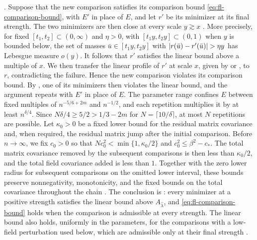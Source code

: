 \cite[Lemma~6.2]{oai-fluctuations}. Suppose that the new comparison satisfies its comparison bound \eqref{eq:fl-comparison-bound}, with $E'$ in place of $E$, and let $r'$ be its minimizer at its final strength. The two minimizers are then close at every scale $y\gtrsim x$ \cite[Lemmas~6.3--6.5]{oai-fluctuations}. More precisely, for fixed $[t_1,t_2]\subset(0,\infty)$ and $\eta>0$, with $[t_1y,t_2y]\subset(0,1)$ when $y$ is bounded below, the set of masses ${\bar u}\in[t_1y,t_2y]$ with $\lvert r({\bar u})-r'({\bar u})\rvert>\eta y$ has Lebesgue measure $o(y)$. It follows that $r'$ satisfies the linear bound above a multiple of $x$. We then transfer the linear profile of $r'$ at scale $x$, given by \cite[Theorem~5.1]{oai-fluctuations} or \cite[Proposition~5.9]{oai-fluctuations}, to $r$, contradicting the failure. Hence the new comparison violates its comparison bound. By \cite[Proposition~3.10]{oai-fluctuations}, one of its minimizers then violates the linear bound, and the argument repeats with $E'$ in place of $E$. The parameter range confines $E$ between fixed multiples of $n^{-5/6+2m}$ and $n^{-1/2}$, and each repetition multiplies it by at least $n^{\delta/4}$. Since $N\delta/4\ge5/2>1/3-2m$ for $N=\lceil10/\delta\rceil$, at most $N$ repetitions are possible. Let $\kappa_0>0$ be a fixed lower bound for the residual matrix covariance and, when required, the residual matrix jump after the initial comparison. Before $n\to\infty$, we fix $c_0>0$ so that $Nc_0^2<\min\{1,\kappa_0/2\}$ and $c_0^2\le\beta^2-c_*$. The total matrix covariance removed by the subsequent comparisons is then less than $\kappa_0/2$, and the total field covariance added is less than $1$. Together with the zero lower radius for subsequent comparisons on the omitted lower interval, these bounds preserve nonnegativity, monotonicity, and the fixed bounds on the total covariance throughout the chain \cite[Proposition~6.6, proof]{oai-fluctuations}. The conclusion is \cite[Proposition~6.6]{oai-fluctuations}: every minimizer at a positive strength satisfies the linear bound above $A_{\widehat\lambda}$, and \eqref{eq:fl-comparison-bound} holds when the comparison is admissible at every strength. The linear bound also holds, uniformly in the parameters, for the comparisons with a low-field perturbation used below, which are admissible only at their final strength \cite[Corollary~6.7]{oai-fluctuations}.

